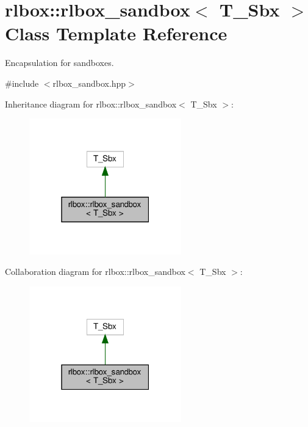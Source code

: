 \hypertarget{classrlbox_1_1rlbox__sandbox}{}\section{rlbox\+:\+:rlbox\+\_\+sandbox$<$ T\+\_\+\+Sbx $>$ Class Template Reference}
\label{classrlbox_1_1rlbox__sandbox}


Encapsulation for sandboxes.  




{\ttfamily \#include $<$rlbox\+\_\+sandbox.\+hpp$>$}



Inheritance diagram for rlbox\+:\+:rlbox\+\_\+sandbox$<$ T\+\_\+\+Sbx $>$\+:
\nopagebreak
\begin{figure}[H]
\begin{center}
\leavevmode
\includegraphics[width=187pt]{classrlbox_1_1rlbox__sandbox__inherit__graph}
\end{center}
\end{figure}


Collaboration diagram for rlbox\+:\+:rlbox\+\_\+sandbox$<$ T\+\_\+\+Sbx $>$\+:
\nopagebreak
\begin{figure}[H]
\begin{center}
\leavevmode
\includegraphics[width=187pt]{classrlbox_1_1rlbox__sandbox__coll__graph}
\end{center}
\end{figure}
